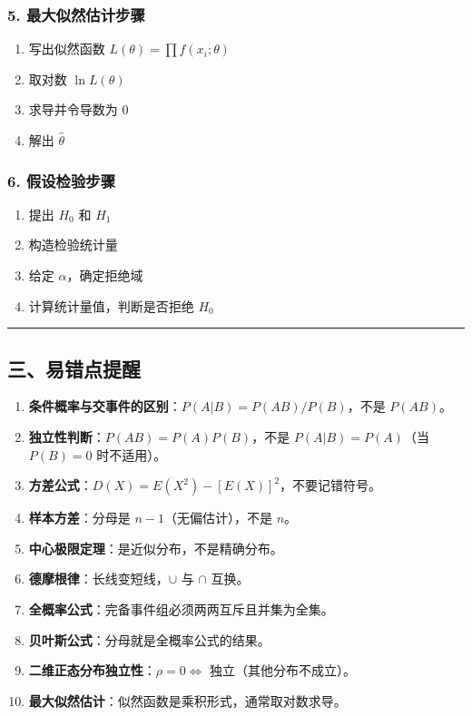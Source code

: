 \documentclass[12pt,a4paper]{ctexart}
\begin{document}
\subsubsection{5. 最大似然估计步骤}
\begin{enumerate}[noitemsep]
    \item 写出似然函数 $L(\theta) = \prod f(x_i; \theta)$
    \item 取对数 $\ln L(\theta)$
    \item 求导并令导数为 0
    \item 解出 $\hat{\theta}$
\end{enumerate}

\subsubsection{6. 假设检验步骤}
\begin{enumerate}[noitemsep]
    \item 提出 $H_0$ 和 $H_1$
    \item 构造检验统计量
    \item 给定 $\alpha$，确定拒绝域
    \item 计算统计量值，判断是否拒绝 $H_0$
\end{enumerate}

\vspace{1em}\hrule\vspace{1em}

\subsection{三、易错点提醒}

\begin{enumerate}[noitemsep]
    \item \textbf{条件概率与交事件的区别}：$P(A|B) = P(AB)/P(B)$，不是 $P(AB)$。
    \item \textbf{独立性判断}：$P(AB) = P(A)P(B)$，不是 $P(A|B) = P(A)$（当 $P(B)=0$ 时不适用）。
    \item \textbf{方差公式}：$D(X) = E(X^2) - [E(X)]^2$，不要记错符号。
    \item \textbf{样本方差}：分母是 $n-1$（无偏估计），不是 $n$。
    \item \textbf{中心极限定理}：是近似分布，不是精确分布。
    \item \textbf{德摩根律}：长线变短线，$\cup$ 与 $\cap$ 互换。
    \item \textbf{全概率公式}：完备事件组必须两两互斥且并集为全集。
    \item \textbf{贝叶斯公式}：分母就是全概率公式的结果。
    \item \textbf{二维正态分布独立性}：$\rho = 0 \iff$ 独立（其他分布不成立）。
    \item \textbf{最大似然估计}：似然函数是乘积形式，通常取对数求导。
\end{enumerate}
\end{document}
